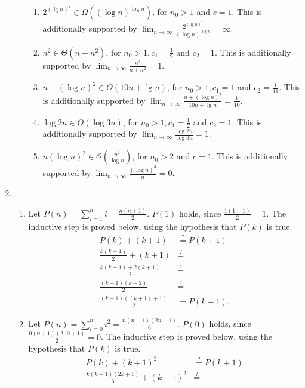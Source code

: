 \documentclass[12pt]{article}
\begin{document}
\begin{enumerate}
\begin{enumerate}
\begin{enumerate}
      \item $2^{{(\lg n)}^{2}} \in \Omega((\log n)^{\log n})$, for $n_{0} > 1$ and $c = 1$. This is additionally supported by $\lim_{n\to\infty} \frac{2^{{(\lg n)}^{2}}}{(\log n)^{\log n}} = \infty$.
      \item $n^{2} \in \Theta(n + n^{2})$, for $n_{0} > 1, c_{1} = \frac{1}{2}$ and $c_{2} = 1$. This is additionally supported by $\lim_{n\to\infty} \frac{n^{2}}{n + n^{2}} = 1$.
      \item $n + (\log n)^{2} \in \Theta(10n + \lg n)$, for $n_{0} > 1, c_{1} = 1$ and $c_{2} = \frac{1}{11}$. This is additionally supported by $\lim_{n\to\infty} \frac{n + (\log n)^{2}}{10n + \lg n} = \frac{1}{10}$.
      \item $\log 2n \in \Theta(\log 3n)$, for $n_{0} > 1, c_{1} = \frac{1}{2}$ and $c_{2} = 1$. This is additionally supported by $\lim_{n\to\infty} \frac{\log 2n}{\log 3n} = 1$.
      \item $n (\log n)^{2} \in \mathcal{O}(\frac{n^{2}}{\log n})$, for $n_{0} > 2$ and $c = 1$. This is additionally supported by $\lim_{n\to\infty} \frac{(\log n)^{3}}{n} = 0$.
    \end{enumerate}
  \end{enumerate}
  \item
  \begin{enumerate}
    \item Let $P(n) = \sum_{i = 1}^{n} i = \frac{n (n + 1)}{2}$. $P(1)$ holds, since $\frac{1 (1 + 1)}{2} = 1$. The inductive step is proved below, using the hypothesis that $P(k)$ is true.
    \begin{align*}
      P(k) + (k + 1) &\stackrel{?}{=} P(k + 1) \\
      \frac{k (k + 1)}{2} + (k + 1) &\stackrel{?}{=} \\
      \frac{k (k + 1) + 2(k + 1)}{2} &\stackrel{?}{=} \\
      \frac{(k + 1)(k + 2)}{2} &\stackrel{?}{=} \\
      \frac{(k + 1)((k + 1) + 1)}{2} &= P(k + 1).
    \end{align*}
    \item Let $P(n) = \sum_{i = 0}^{n} i^{2} = \frac{n (n + 1) (2n + 1)}{6}$. $P(0)$ holds, since $\frac{0 (0 + 1) (2 \cdot 0 + 1)}{2} = 0$. The inductive step is proved below, using the hypothesis that $P(k)$ is true.
    \begin{align*}
      P(k) + (k + 1)^{2} &\stackrel{?}{=} P(k + 1) \\
      \frac{k (k + 1) (2k + 1)}{6} + (k + 1)^{2} &\stackrel{?}{=} \\

\end{align*}
\end{enumerate}
\end{enumerate}
\end{document}
